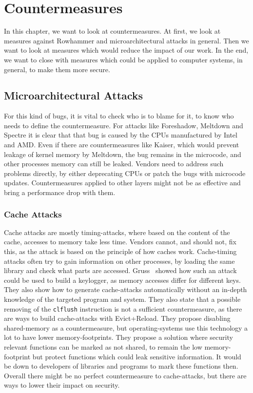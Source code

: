 \chapter{Countermeasures}\label{sec:countermeasure}

In this chapter, we want to look at countermeasures. At first, we look at
measures against Rowhammer and microarchitectural attacks in general. Then we
want to look at measures which would reduce the impact of our work. In the end,
we want to close with measures which could be applied to computer systems, in
general, to make them more secure.

\section{Microarchitectural Attacks}

For this kind of bugs, it is vital to check who is to blame for it, to know who
needs to define the countermeasure. For attacks like
Foreshadow\cite{foreshadow}, Meltdown\cite{meltdown} and
Spectre\cite{spectre} it is clear that that bug is caused by the CPUs
manufactured by Intel and AMD. Even if there are countermeasures like
Kaiser\cite{kaiserpaper}, which would prevent leakage of kernel memory by
Meltdown, the bug remains in the microcode, and other processes\textquotesingle
memory can still be leaked. Vendors need to address such problems directly, by
either deprecating CPUs or patch the bugs with microcode updates.
Countermeasures applied to other layers might not be as effective and bring a
performance drop with them.

\subsection{Cache Attacks}

Cache attacks are mostly timing-attacks, where based on the content of the
cache, accesses to memory take less time. Vendors cannot, and should not, fix
this, as the attack is based on the principle of how caches work. Cache-timing
attacks often try to gain information on other processes, by loading the same
library and check what parts are accessed. Gruss~\etal\cite{gruss2015cache}
showed how such an attack could be used to build a keylogger, as memory accesses
differ for different keys. They also show how to generate cache-attacks
automatically without an in-depth knowledge of the targeted program and system.
They also state that a possible removing of the \texttt{clflush} instruction is
not a sufficient countermeasure, as there are ways to build cache-attacks with
Evict+Reload. They propose disabling shared-memory as a countermeasure, but
operating-systems use this technology a lot to have lower memory-footprints.
They propose a solution where security relevant functions can be marked as not
shared, to remain the low memory-footprint but protect functions which could
leak sensitive information. It would be down to developers of libraries and
programs to mark these functions then. Overall there might be no perfect
countermeasure to cache-attacks, but there are ways to lower their impact on
security.


